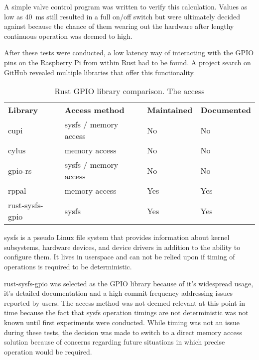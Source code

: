 A simple valve control program was written to verify this calculation. Values as low as \SI{40}{\milli\second} still resulted in a full on/off switch but were ultimately decided against because the chance of them wearing out the hardware after lengthy continuous operation was deemed to high.

After these tests were conducted, a low latency way of interacting with the GPIO pins on the Raspberry Pi from within Rust had to be found. A project search on GitHub revealed multiple libraries that offer this functionality. 

\begin{table}[h]
\centering
\begin{tabular}{llll}
\textbf{Library} & \textbf{Access method} & \textbf{Maintained} & \textbf{Documented} \\
cupi             & sysfs / memory access  & No                  & No                  \\
cylus            & memory access          & No                  & No                  \\
gpio-rs          & sysfs / memory access  & No                  & No                  \\
rppal            & memory access          & Yes                 & Yes                 \\
rust-sysfs-gpio  & sysfs                  & Yes                 & Yes
\end{tabular}
\caption{Rust GPIO library comparison. The access }
\end{table}

sysfs is a pseudo Linux file system that provides information about kernel subsystems, hardware devices, and device drivers in addition to the ability to configure them. It lives in userspace and can not be relied upon if timing of operations is required to be deterministic. 

rust-sysfs-gpio \cite{rust-sysfs-gpio} was selected as the GPIO library because of it's widespread usage, it's detailed documentation and a high commit frequency addressing issues reported by users. The access method was not deemed relevant at this point in time because the fact that sysfs operation timings are not deterministic was not known until first experiments were conducted. While timing was not an issue during these tests, the decision was made to switch to a direct memory access solution because of concerns regarding future situations in which precise operation would be required. 

